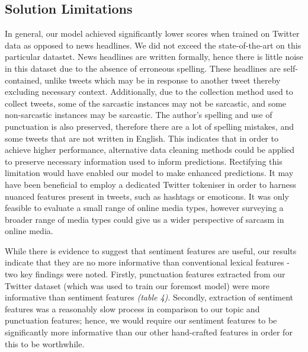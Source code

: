 \documentclass[12pt,a4paper]{article}
\begin{document}


\subsection{Solution Limitations}\vspace{-10pt}
In general, our model achieved significantly lower scores when trained on Twitter data as opposed to news headlines. We did not exceed the state-of-the-art on this particular datastet. News headlines are written formally, hence there is little noise in this dataset due to the absence of erroneous spelling. These headlines are self-contained, unlike tweets which may be in response to another tweet thereby excluding necessary context. Additionally, due to the collection method used to collect tweets, some of the sarcastic instances may not be sarcastic, and some non-sarcastic instances may be sarcastic. The author's spelling and use of punctuation is also preserved, therefore there are a lot of spelling mistakes, and some tweets that are not written in English. This indicates that in order to achieve higher performance, alternative data cleaning methods could be applied to preserve necessary information used to inform predictions. Rectifying this limitation would have enabled our model to make enhanced predictions. It may have been beneficial to employ a dedicated Twitter tokeniser in order to harness nuanced features present in tweets, such as hashtags or emoticons. It was only feasible to evaluate a small range of online media types, however surveying a broader range of media types could give us a wider perspective of sarcasm in online media.

While there is evidence to suggest that sentiment features are useful, our results indicate that they are no more informative than conventional lexical features - two key findings were noted. Firstly, punctuation features extracted from our Twitter dataset (which was used to train our foremost model) were more informative than sentiment features \textit{(table 4)}. Secondly, extraction of sentiment features was a reasonably slow process in comparison to our topic and punctuation features; hence, we would require our sentiment features to be significantly more informative than our other hand-crafted features in order for this to be worthwhile.


\end{document}
